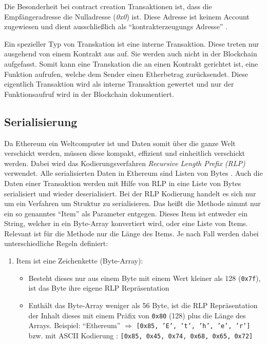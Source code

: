 \documentclass[runningheads]{llncs}
\begin{document}
Die Besonderheit bei contract creation Transaktionen ist, dass die Empfängeradresse die Nulladresse (\textit{0x0}) ist. Diese Adresse ist keinem Account zugewiesen und dient ausschließlich als "`kontrakterzeugungs Adresse"' \cite{antonopoulos_mastering_2019}.

Ein spezieller Typ von Transkation ist eine interne Transaktion. Diese treten nur ausgehend von einem Kontrakt aus auf. Sie werden auch nicht in der Blockchain aufgefasst. Somit kann eine Transkation die an einen Kontrakt gerichtet ist, eine Funktion aufrufen, welche dem Sender einen Etherbetrag zurücksendet. Diese eigentlich Transaktion wird als interne Transaktion gewertet und nur der Funktionsaufruf wird in der Blockchain dokumentiert.

\subsection{Serialisierung}
Da Ethereum ein Weltcomputer ist und Daten somit über die ganze Welt verschickt werden, müssen diese kompakt, effizient und einheitlich verschickt werden. Dabei wird das Kodierungsverfahren \textit{Recursive Length Prefix (RLP)} verwendet. Alle serialisierten Daten in Ethereum sind Listen von Bytes \cite[S. 3]{wood_ethereum/yellowpaper_2019}. Auch die Daten einer Transaktion werden mit Hilfe von RLP in eine Liste von Bytes serialisiert und wieder deserialisiert. Bei der RLP Kodierung handelt es sich nur um ein Verfahren um Struktur zu serialisieren. Das heißt die Methode nimmt nur ein so genanntes "`Item"' als Parameter entgegen. Dieses Item ist entweder ein String, welcher in ein Byte-Array konvertiert wird, oder eine Liste von Items. Relevant ist für die Methode nur die Länge des Items. Je nach Fall werden dabei unterschiedliche Regeln definiert:
\begin{enumerate}
  \item Item ist eine Zeichenkette (Byte-Array):
  \begin{itemize}
    \item Besteht dieses nur aus einem Byte mit einem Wert kleiner als 128 (\texttt{0x7f}), ist das Byte ihre eigene RLP Repräsentation
    \item Enthält das Byte-Array weniger als 56 Byte, ist die RLP Repräsentation der Inhalt dieses mit einem Präfix von \texttt{0x80} (128) plus die Länge des Arrays. Beispiel: "`Ethereum"' $\Rightarrow$ \texttt{[0x85, 'E', 't', 'h', 'e', 'r']} bzw. mit ASCII Kodierung : \texttt{[0x85, 0x45, 0x74, 0x68, 0x65, 0x72]}
  \end{itemize} 
\end{enumerate}
\end{document}

